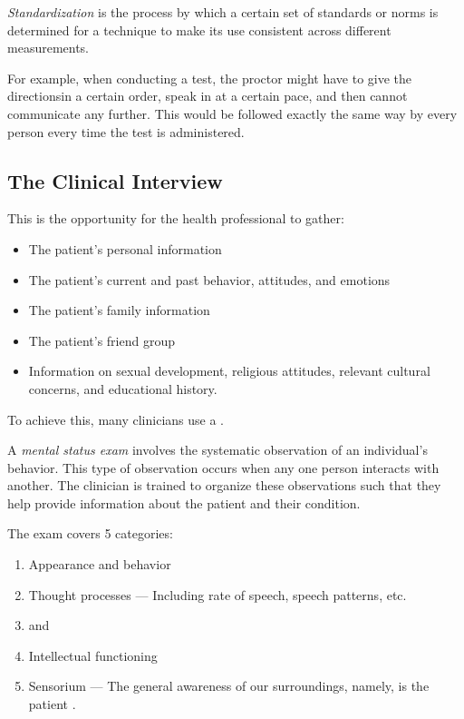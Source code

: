 \begin{definition}[Standardization]\label{def:Standardization}
  \emph{Standardization} is the process by which a certain set of standards or norms is determined for a technique to make its use consistent across different measurements.

  For example, when conducting a test, the proctor might have to give the directionsin a certain order, speak in at a certain pace, and then cannot communicate any further.
  This would be followed exactly the same way by every person every time the test is administered.
\end{definition}

\subsection{The Clinical Interview}\label{subsec:The_Clinical_Interview}
This is the opportunity for the health professional to gather:
\begin{itemize}[noitemsep]
\item The patient's personal information
\item The patient's current and past behavior, attitudes, and emotions
\item The patient's family information
\item The patient's friend group
\item Information on sexual development, religious attitudes, relevant cultural concerns, and educational history.
\end{itemize}

To achieve this, many clinicians use a .

\begin{definition}\label{def:Mental_Status_Exam}
  A \emph{mental status exam} involves the systematic observation of an individual's behavior.
  This type of observation occurs when any one person interacts with another.
  The clinician is trained to organize these observations such that they help provide information about the patient and their condition.

  The exam covers 5 categories:
  \begin{enumerate}[noitemsep]
  \item Appearance and behavior
  \item Thought processes --- Including rate of speech, speech patterns, etc.
  \item {} and 
  \item Intellectual functioning
  \item Sensorium --- The general awareness of our surroundings, namely, is the patient .
  \end{enumerate}
\end{definition}

